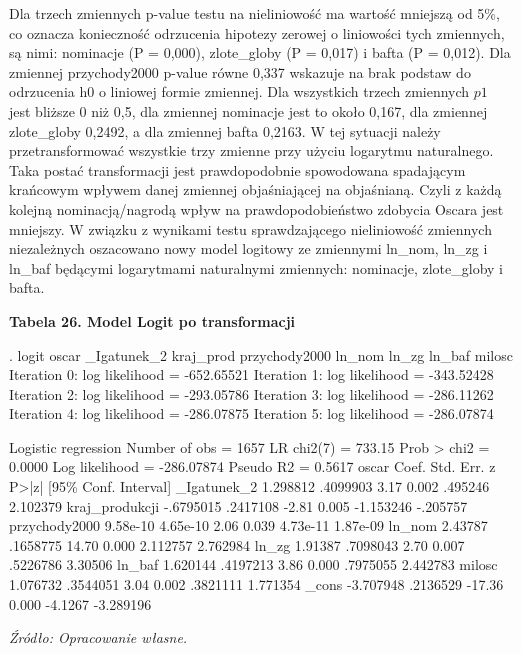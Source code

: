 Dla trzech zmiennych p-value testu na nieliniowość ma wartość mniejszą od 5\%, co oznacza konieczność odrzucenia hipotezy  zerowej o liniowości tych zmiennych, są nimi: nominacje (P = 0,000), zlote_globy (P = 0,017) i bafta (P = 0,012). Dla zmiennej przychody2000 p-value równe 0,337 wskazuje na brak podstaw do odrzucenia h0 o liniowej formie zmiennej. Dla wszystkich trzech zmiennych $p1$ jest bliższe 0 niż 0,5, dla zmiennej nominacje jest to około 0,167, dla zmiennej zlote_globy 0,2492, a dla zmiennej bafta 0,2163. W tej sytuacji należy przetransformować wszystkie trzy zmienne przy użyciu logarytmu naturalnego. Taka postać transformacji jest prawdopodobnie spowodowana spadającym krańcowym wpływem danej zmiennej objaśniającej na objaśnianą. Czyli z każdą kolejną nominacją/nagrodą wpływ na prawdopodobieństwo zdobycia Oscara jest mniejszy. W związku z wynikami testu sprawdzającego nieliniowość zmiennych niezależnych oszacowano nowy model logitowy ze zmiennymi ln_nom, ln_zg i ln_baf będącymi logarytmami naturalnymi zmiennych: nominacje, zlote_globy i bafta.

\vspace{0.5cm}
\textbf{Tabela 26. Model Logit po transformacji}
\begin{stlog}
. logit oscar _Igatunek_2 kraj_prod przychody2000 ln_nom ln_zg ln_baf milosc
Iteration 0:   log likelihood = -652.65521  
Iteration 1:   log likelihood = -343.52428  
Iteration 2:   log likelihood = -293.05786  
Iteration 3:   log likelihood = -286.11262  
Iteration 4:   log likelihood = -286.07875  
Iteration 5:   log likelihood = -286.07874  

Logistic regression                               Number of obs   =       1657
                                                  LR chi2(7)      =     733.15
                                                  Prob > chi2     =     0.0000
Log likelihood = -286.07874                       Pseudo R2       =     0.5617
         oscar {\VBAR}      Coef.   Std. Err.      z    P>|z|     [95\% Conf. Interval]
   _Igatunek_2 {\VBAR}   1.298812   .4099903     3.17   0.002      .495246    2.102379
kraj_produkcji {\VBAR}  -.6795015   .2417108    -2.81   0.005    -1.153246    -.205757
 przychody2000 {\VBAR}   9.58e-10   4.65e-10     2.06   0.039     4.73e-11    1.87e-09
        ln_nom {\VBAR}    2.43787   .1658775    14.70   0.000     2.112757    2.762984
         ln_zg {\VBAR}    1.91387   .7098043     2.70   0.007     .5226786     3.30506
        ln_baf {\VBAR}   1.620144   .4197213     3.86   0.000     .7975055    2.442783
        milosc {\VBAR}   1.076732   .3544051     3.04   0.002     .3821111    1.771354
         _cons {\VBAR}  -3.707948   .2136529   -17.36   0.000      -4.1267   -3.289196
 \end{stlog}
\textit{\footnotesize{Źródło: Opracowanie własne.}} \\

